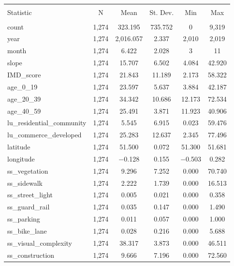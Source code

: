 
\begin{table}[!htbp] \centering 
  \caption{} 
  \label{} 
\begin{tabular}{@{\extracolsep{5pt}}lccccc} 
\\[-1.8ex]\hline 
\hline \\[-1.8ex] 
Statistic & \multicolumn{1}{c}{N} & \multicolumn{1}{c}{Mean} & \multicolumn{1}{c}{St. Dev.} & \multicolumn{1}{c}{Min} & \multicolumn{1}{c}{Max} \\ 
\hline \\[-1.8ex] 
count & 1,274 & 323.195 & 735.752 & 0 & 9,319 \\ 
year & 1,274 & 2,016.057 & 2.337 & 2,010 & 2,019 \\ 
month & 1,274 & 6.422 & 2.028 & 3 & 11 \\ 
slope & 1,274 & 15.707 & 6.502 & 4.084 & 42.920 \\ 
IMD\_score & 1,274 & 21.843 & 11.189 & 2.173 & 58.322 \\ 
age\_0\_19 & 1,274 & 23.597 & 5.637 & 3.884 & 42.187 \\ 
age\_20\_39 & 1,274 & 34.342 & 10.686 & 12.173 & 72.534 \\ 
age\_40\_59 & 1,274 & 25.491 & 3.871 & 11.923 & 40.906 \\ 
lu\_residential\_community & 1,274 & 5.545 & 6.915 & 0.023 & 59.476 \\ 
lu\_commerce\_developed & 1,274 & 25.283 & 12.637 & 2.345 & 77.496 \\ 
latitude & 1,274 & 51.500 & 0.072 & 51.300 & 51.681 \\ 
longitude & 1,274 & $-$0.128 & 0.155 & $-$0.503 & 0.282 \\ 
ss\_vegetation & 1,274 & 9.296 & 7.252 & 0.000 & 70.740 \\ 
ss\_sidewalk & 1,274 & 2.222 & 1.739 & 0.000 & 16.513 \\ 
ss\_street\_light & 1,274 & 0.005 & 0.021 & 0.000 & 0.358 \\ 
ss\_guard\_rail & 1,274 & 0.035 & 0.147 & 0.000 & 1.490 \\ 
ss\_parking & 1,274 & 0.011 & 0.057 & 0.000 & 1.000 \\ 
ss\_bike\_lane & 1,274 & 0.028 & 0.216 & 0.000 & 5.688 \\ 
ss\_visual\_complexity & 1,274 & 38.317 & 3.873 & 0.000 & 46.511 \\ 
ss\_construction & 1,274 & 9.666 & 7.196 & 0.000 & 72.560 \\ 

\end{tabular}
\end{table}
